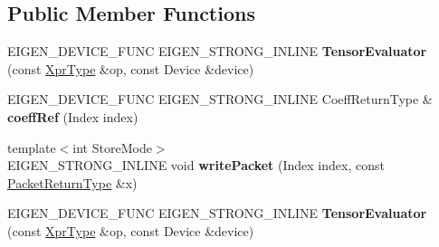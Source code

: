 \subsection*{Public Member Functions}
\begin{DoxyCompactItemize}
\item 
\mbox{\label{struct_eigen_1_1_tensor_evaluator_3_01_tensor_shuffling_op_3_01_shuffle_00_01_arg_type_01_4_00_01_device_01_4_a19c00b658f5330bcb9ce87bf299d20da}} 
E\+I\+G\+E\+N\+\_\+\+D\+E\+V\+I\+C\+E\+\_\+\+F\+U\+NC E\+I\+G\+E\+N\+\_\+\+S\+T\+R\+O\+N\+G\+\_\+\+I\+N\+L\+I\+NE {\bfseries Tensor\+Evaluator} (const \hyperlink{class_eigen_1_1_tensor_shuffling_op}{Xpr\+Type} \&op, const Device \&device)
\item 
\mbox{\label{struct_eigen_1_1_tensor_evaluator_3_01_tensor_shuffling_op_3_01_shuffle_00_01_arg_type_01_4_00_01_device_01_4_a3ef6dd4d4cae360e010bfde3bed03a43}} 
E\+I\+G\+E\+N\+\_\+\+D\+E\+V\+I\+C\+E\+\_\+\+F\+U\+NC E\+I\+G\+E\+N\+\_\+\+S\+T\+R\+O\+N\+G\+\_\+\+I\+N\+L\+I\+NE Coeff\+Return\+Type \& {\bfseries coeff\+Ref} (Index index)
\item 
\mbox{\label{struct_eigen_1_1_tensor_evaluator_3_01_tensor_shuffling_op_3_01_shuffle_00_01_arg_type_01_4_00_01_device_01_4_a9e7da98c27399c74f5459daedb0ec8e2}} 
{\footnotesize template$<$int Store\+Mode$>$ }\\E\+I\+G\+E\+N\+\_\+\+S\+T\+R\+O\+N\+G\+\_\+\+I\+N\+L\+I\+NE void {\bfseries write\+Packet} (Index index, const \hyperlink{group___sparse_core___module}{Packet\+Return\+Type} \&x)
\item 
\mbox{\label{struct_eigen_1_1_tensor_evaluator_3_01_tensor_shuffling_op_3_01_shuffle_00_01_arg_type_01_4_00_01_device_01_4_a19c00b658f5330bcb9ce87bf299d20da}} 
E\+I\+G\+E\+N\+\_\+\+D\+E\+V\+I\+C\+E\+\_\+\+F\+U\+NC E\+I\+G\+E\+N\+\_\+\+S\+T\+R\+O\+N\+G\+\_\+\+I\+N\+L\+I\+NE {\bfseries Tensor\+Evaluator} (const \hyperlink{class_eigen_1_1_tensor_shuffling_op}{Xpr\+Type} \&op, const Device \&device)

\end{DoxyCompactItemize}
